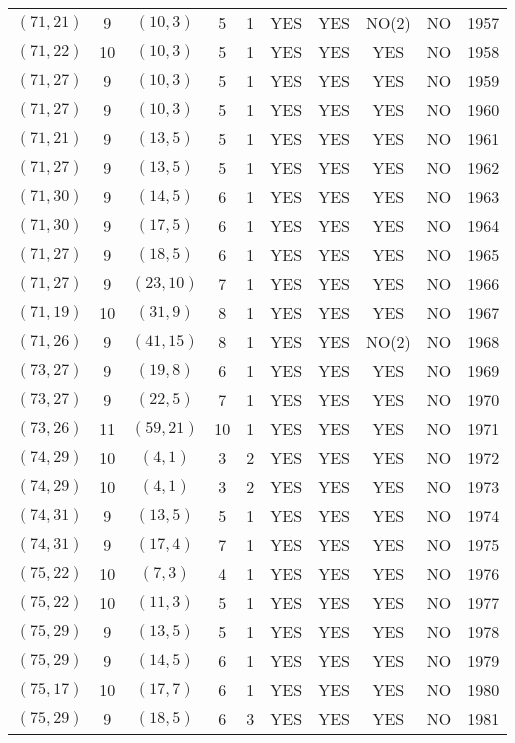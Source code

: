 \begin{longtable}{|c|c|c|c|c|c|c|c|c|c|}
$(71, 21)$ & 9 & $(10, 3)$ & 5 & 1 & YES & YES & NO(2) & NO & 1957\\
$(71, 22)$ & 10 & $(10, 3)$ & 5 & 1 & YES & YES & YES & NO & 1958\\
$(71, 27)$ & 9 & $(10, 3)$ & 5 & 1 & YES & YES & YES & NO & 1959\\
$(71, 27)$ & 9 & $(10, 3)$ & 5 & 1 & YES & YES & YES & NO & 1960\\
$(71, 21)$ & 9 & $(13, 5)$ & 5 & 1 & YES & YES & YES & NO & 1961\\
$(71, 27)$ & 9 & $(13, 5)$ & 5 & 1 & YES & YES & YES & NO & 1962\\
$(71, 30)$ & 9 & $(14, 5)$ & 6 & 1 & YES & YES & YES & NO & 1963\\
$(71, 30)$ & 9 & $(17, 5)$ & 6 & 1 & YES & YES & YES & NO & 1964\\
$(71, 27)$ & 9 & $(18, 5)$ & 6 & 1 & YES & YES & YES & NO & 1965\\
$(71, 27)$ & 9 & $(23, 10)$ & 7 & 1 & YES & YES & YES & NO & 1966\\
$(71, 19)$ & 10 & $(31, 9)$ & 8 & 1 & YES & YES & YES & NO & 1967\\
$(71, 26)$ & 9 & $(41, 15)$ & 8 & 1 & YES & YES & NO(2) & NO & 1968\\
$(73, 27)$ & 9 & $(19, 8)$ & 6 & 1 & YES & YES & YES & NO & 1969\\
$(73, 27)$ & 9 & $(22, 5)$ & 7 & 1 & YES & YES & YES & NO & 1970\\
$(73, 26)$ & 11 & $(59, 21)$ & 10 & 1 & YES & YES & YES & NO & 1971\\
$(74, 29)$ & 10 & $(4, 1)$ & 3 & 2 & YES & YES & YES & NO & 1972\\
$(74, 29)$ & 10 & $(4, 1)$ & 3 & 2 & YES & YES & YES & NO & 1973\\
$(74, 31)$ & 9 & $(13, 5)$ & 5 & 1 & YES & YES & YES & NO & 1974\\
$(74, 31)$ & 9 & $(17, 4)$ & 7 & 1 & YES & YES & YES & NO & 1975\\
$(75, 22)$ & 10 & $(7, 3)$ & 4 & 1 & YES & YES & YES & NO & 1976\\
$(75, 22)$ & 10 & $(11, 3)$ & 5 & 1 & YES & YES & YES & NO & 1977\\
$(75, 29)$ & 9 & $(13, 5)$ & 5 & 1 & YES & YES & YES & NO & 1978\\
$(75, 29)$ & 9 & $(14, 5)$ & 6 & 1 & YES & YES & YES & NO & 1979\\
$(75, 17)$ & 10 & $(17, 7)$ & 6 & 1 & YES & YES & YES & NO & 1980\\
$(75, 29)$ & 9 & $(18, 5)$ & 6 & 3 & YES & YES & YES & NO & 1981\\

\end{longtable}
